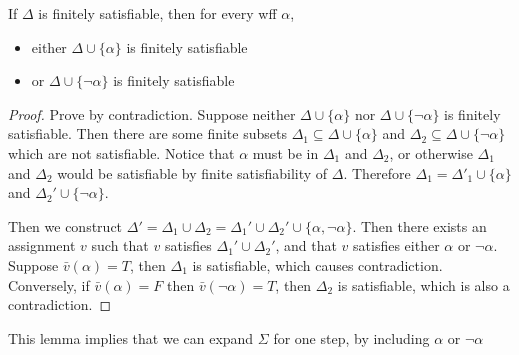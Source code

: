 \begin{lemma}
    \label{lem:CompactnessLemma1}
    If $\Delta$ is finitely satisfiable, then for every wff $\alpha$,
    \begin{itemize}
        \item either $\Delta\cup\{\alpha\}$ is finitely satisfiable
        \item or $\Delta\cup\{\neg\alpha\}$ is finitely satisfiable
    \end{itemize}
\end{lemma}
\begin{proof}
    Prove by contradiction. Suppose neither $\Delta\cup\{\alpha\}$ nor $\Delta\cup\{\neg\alpha\}$ is finitely satisfiable. Then there are some finite subsets $\Delta_1 \subseteq \Delta\cup\{\alpha\}$ and $\Delta_2\subseteq\Delta\cup\{\neg\alpha\}$ which are not satisfiable. Notice that $\alpha$ must be in $\Delta_1$ and $\Delta_2$, or otherwise $\Delta_1$ and $\Delta_2$ would be satisfiable by finite satisfiability of $\Delta$. Therefore $\Delta_1 = \Delta'_1\cup\{\alpha\}$ and $\Delta_2'\cup\{\neg\alpha\}$.

    Then we construct $\Delta' = \Delta_1\cup\Delta_2 = \Delta_1'\cup\Delta_2'\cup\{\alpha,\neg\alpha\}$. Then there exists an assignment $v$ such that $v$ satisfies $\Delta_1'\cup\Delta_2'$, and that $v$ satisfies either $\alpha$ or $\neg\alpha$. Suppose $\bar{v}(\alpha)=T$, then $\Delta_1$ is satisfiable, which causes contradiction. Conversely, if $\bar{v}(\alpha) = F$ then $\bar{v}(\neg\alpha)=T$, then $\Delta_2$ is satisfiable, which is also a contradiction.
\end{proof}
\begin{remark}
    This lemma implies that we can expand $\Sigma$ for one step, by including $\alpha$ or $\neg\alpha$
\end{remark}


